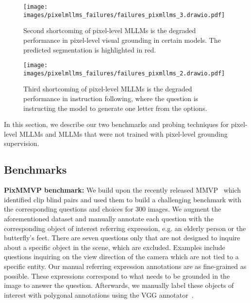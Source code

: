 \begin{figure*}[t]
\centering
\texttt{[image: images/pixelmllms\_failures/failures\_pixmllms\_3.drawio.pdf]}
\vspace{-2em}
\caption{Second shortcoming of pixel-level MLLMs is the degraded performance in pixel-level visual grounding in certain models. The predicted segmentation is highlighted in red.} 
\label{fig:shortcoming3}
\vspace{-1em}
\end{figure*}

\begin{figure}[t]
\centering
\texttt{[image: images/pixelmllms\_failures/failures\_pixmllms\_2.drawio.pdf]}
\vspace{-2em}
\caption{Third shortcoming of pixel-level MLLMs is the degraded performance in instruction following, where the question is instructing the model to generate one letter from the options.} 
\label{fig:shortcoming2}
\vspace{-1em}
\end{figure}

In this section, we describe our two benchmarks and probing techniques for pixel-level MLLMs and MLLMs that were not trained with pixel-level grounding supervision.
\subsection{Benchmarks}
\textbf{PixMMVP benchmark:} We build upon the recently released MMVP~\cite{tong2024eyes} which identified clip blind pairs and used them to build a challenging benchmark with the corresponding questions and choices for 300 images. We augment the aforementioned dataset and manually annotate each question with the corresponding object of interest referring expression, e.g. an elderly person or the butterfly's feet. There are seven questions only that are not designed to inquire about a specific object in the scene, which are excluded. Examples include questions inquiring on the view direction of the camera which are not tied to a specific entity. Our manual referring expression annotations are as fine-grained as possible. These expressions correspond to what needs to be grounded in the image to answer the question. Afterwards, we manually label these objects of interest with polygonal annotations using the VGG annotator~\cite{dutta2016via}.

